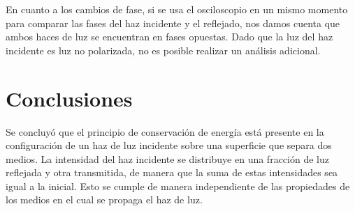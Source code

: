 \documentclass[
aps,
reprint,
amsmath, amssymb,
superscriptaddress,
]{revtex4-2}
\begin{document}
En cuanto a los cambios de fase, si se usa el osciloscopio en un mismo momento para comparar las fases del haz incidente y el reflejado, nos damos cuenta que ambos haces de luz se encuentran en fases opuestas. Dado que la luz del haz incidente es luz no polarizada, no es posible realizar un análisis adicional.

\section{Conclusiones}
Se concluyó que el principio de conservación de energía está presente en la configuración de un haz de luz incidente sobre una superficie que separa dos medios. La intensidad del haz incidente se distribuye en una fracción de luz reflejada y otra transmitida, de manera que la suma de estas intensidades sea igual a la inicial. Esto se cumple de manera independiente de las propiedades de los medios en el cual se propaga el haz de luz. 


\end{document}
